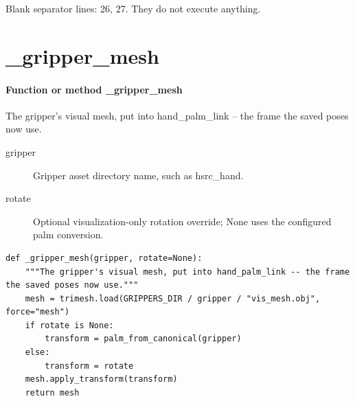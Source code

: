\documentclass[11pt,a4paper]{book}
\begin{document}
Blank separator lines: 26, 27. They do not execute anything.

\section{\_gripper\_mesh}

\paragraph{Function or method \_gripper\_mesh}
The gripper's visual mesh, put into hand\_palm\_link -- the frame the saved poses now use.

\begin{description}
\item[gripper] Gripper asset directory name, such as hsrc\_hand.
\item[rotate] Optional visualization-only rotation override; None uses the configured palm conversion.
\end{description}

\begin{lstlisting}[firstnumber=28]
def _gripper_mesh(gripper, rotate=None):
    """The gripper's visual mesh, put into hand_palm_link -- the frame the saved poses now use."""
    mesh = trimesh.load(GRIPPERS_DIR / gripper / "vis_mesh.obj", force="mesh")
    if rotate is None:
        transform = palm_from_canonical(gripper)
    else:
        transform = rotate
    mesh.apply_transform(transform)
    return mesh


\end{lstlisting}
\end{document}

